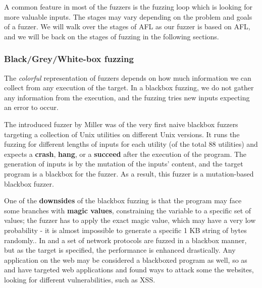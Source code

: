 A common feature in most of the fuzzers is the fuzzing loop which is looking for more valuable inputs. The stages may vary depending on the problem and goals of a fuzzer. We will walk over the stages of AFL as our fuzzer is based on AFL, and we will be back on the stages of fuzzing in the following sections.

\subsubsection*{Black/Grey/White-box fuzzing}

The \textit{colorful} representation of fuzzers depends on how much information we can collect from any execution of the target. In a blackbox fuzzing, we do not gather any information from the execution, and the fuzzing tries new inputs expecting an error to occur.




The introduced fuzzer by Miller \cite{miller1990empirical} was of the very first naive blackbox fuzzers targeting a collection of Unix utilities on different Unix versions. It runs the fuzzing for different lengths of inputs for each utility (of the total 88 utilities) and expects a \textbf{crash}, \textbf{hang}, or a \textbf{succeed} after the execution of the program. The generation of inputs is by the mutation of the inputs' content, and the target program is a blackbox for the fuzzer. As a result, this fuzzer is a mutation-based blackbox fuzzer.


One of the \textbf{downsides} of the blackbox fuzzing is that the program may face some branches with \textbf{magic values}, constraining the variable to a specific set of values; the fuzzer has to apply the exact magic value, which may have a very low probability - it is almost impossible to generate a specific 1 KB string of bytes randomly.. In \cite{banks2006snooze} and \cite{gascon2015pulsar} a set of network protocols are fuzzed in a blackbox manner, but as the target is specified, the performance is enhanced drastically. Any application on the web may be considered a blackboxed program as well, so as \cite{doupe2012enemy} and \cite{duchene2012xss} have targeted web applications and found ways to attack some the websites, looking for different vulnerabilities, such as XSS.

